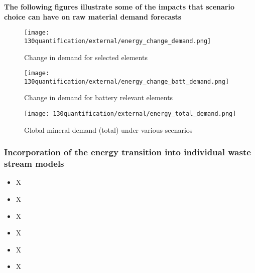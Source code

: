 \vspace{2cm}

\textbf{The following figures illustrate some of the impacts that scenario choice can have on raw material demand forecasts~\cite{iea2023crm}}

\begin{figure}[h!]
    \centering
    \texttt{[image: 130quantification/external/energy\_change\_demand.png]}
    \caption{Change in demand for selected elements}\label{fig:energy_change_demand}
\end{figure}

\begin{figure}[h!]
    \centering
    \texttt{[image: 130quantification/external/energy\_change\_batt\_demand.png]}
    \caption{Change in demand for battery relevant elements}\label{fig:energy_demand_batt}
\end{figure}

\begin{figure}[h!]
    \centering
    \texttt{[image: 130quantification/external/energy\_total\_demand.png]}
    \caption{Global mineral demand (total) under various scenarios}\label{fig:energy_mineral_total}
\end{figure}

\subsectionEndline
\clearpage

\subsubsection{Incorporation of the energy transition into individual waste stream models}




\wasteSubsubsubsecBATT
\vspace{-1cm}
\begin{itemize}
    \item X
\end{itemize}

\wasteSubsubsubsecCDW
\vspace{-1cm}
\begin{itemize}
    \item X
\end{itemize}

\wasteSubsubsubsecELV
\vspace{-1cm}
\begin{itemize}
    \item X
\end{itemize}

\wasteSubsubsubsecMIN
\vspace{-1cm}
\begin{itemize}
    \item X
\end{itemize}

\wasteSubsubsubsecSLASH
\vspace{-1cm}
\begin{itemize}
    \item X
\end{itemize}

\wasteSubsubsubsecWEEE
\vspace{-1cm}
\begin{itemize}
    \item X
\end{itemize}



\subsectionEndline

\clearpage
